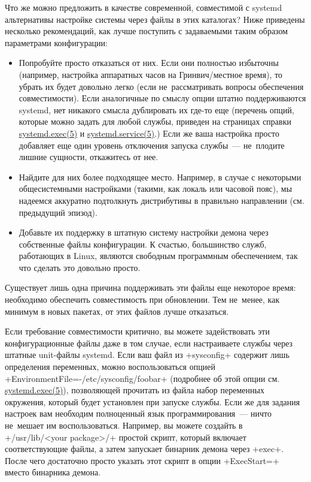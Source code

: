 \documentclass[10pt,oneside,a4paper]{article}
\begin{document}
Что же можно предложить в качестве современной, совместимой с systemd
альтернативы настройке системы через файлы в этих каталогах? Ниже приведены
несколько рекомендаций, как лучше поступить с задаваемыми таким образом параметрами
конфигурации:
\begin{itemize}
	\item Попробуйте просто отказаться от них. Если они полностью избыточны (например,
		настройка аппаратных часов на Гринвич/местное время), то убрать
		их будет довольно легко (если не~рассматривать вопросы
		обеспечения совместимости). Если аналогичные по смыслу опции
		штатно поддерживаются systemd, нет никакого смысла дублировать
		их где-то еще (перечень опций, которые можно задать для любой
		службы, приведен на страницах справки
		\href{http://0pointer.de/public/systemd-man/systemd.exec.html}{systemd.exec(5)}
		и
		\href{http://0pointer.de/public/systemd-man/systemd.service.html}{systemd.service(5)}.)
		Если же ваша настройка просто добавляет еще один уровень
		отключения запуска службы~--- не~плодите лишние сущности,
		откажитесь от нее.
	\item Найдите для них более подходящее место. Например, в случае с
		некоторыми общесистемными настройками (такими, как локаль или
		часовой пояс), мы надеемся аккуратно подтолкнуть дистрибутивы в
		правильно направлении (см. предыдущий эпизод).
	\item Добавьте их поддержку в штатную систему настройки демона через
		собственные файлы конфигурации. К счастью, большинство служб,
		работающих в Linux, являются свободным программным обеспечением,
		так что сделать это довольно просто.
\end{itemize}

Существует лишь одна причина поддерживать эти файлы еще некоторое
время: необходимо обеспечить совместимость при обновлении. Тем не~менее, как
минимум в новых пакетах, от этих файлов лучше отказаться.

Если требование совместимости критично, вы можете задействовать эти
конфигурационные файлы даже в том случае, если настраиваете службы через
штатные unit-файлы systemd. Если ваш файл из +sysconfig+ содержит лишь
определения переменных, можно воспользоваться опцией
+EnvironmentFile=-/etc/sysconfig/foobar+ (подробнее об этой опции см.
\href{http://0pointer.de/public/systemd-man/systemd.exec.html}{systemd.exec(5)}),
позволяющей прочитать из файла набор переменных окружения, который будет
установлен при запуске службы. Если же для задания настроек вам необходим
полноценный язык программирования~--- ничто не~мешает им воспользоваться.
Например, вы можете создайть в +/usr/lib/<your package>/+ простой скрипт,
который включает соответствующие файлы, а затем запускает бинарник демона через
+exec+. После чего достаточно просто указать этот скрипт в опции +ExecStart=+
вместо бинарника демона.
\end{document}
